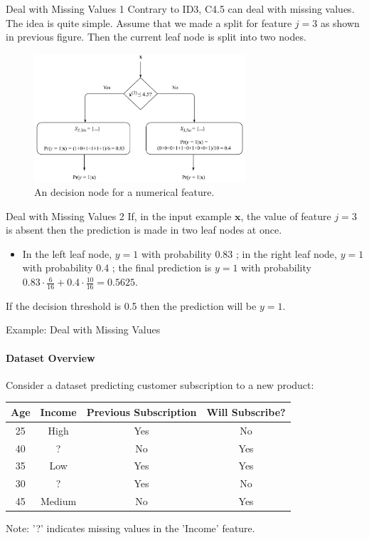 \documentclass[9pt,dvipsnames]{beamer}
\begin{document}
	\begin{frame}{Deal with Missing Values 1}
		Contrary to ID3, C4.5 can deal with missing values. The idea is quite simple. Assume that we made a split for feature $j=3$ as shown in previous figure. Then the current leaf node is split into two nodes.
		\begin{figure}
			\centering
			\includegraphics[width=0.7\textwidth]{imgs/algorithm_8.jpg}
			\caption{An decision node for a numerical feature.}
		\end{figure}
	\end{frame}
	\begin{frame}{Deal with Missing Values 2}
		If, in the input example $\mathbf{x}$, the value of feature $j=3$ is absent then the prediction is made in two leaf nodes at once. 
		\begin{itemize}
			\item In the left leaf node, $y=1$ with probability 0.83 ; in the right leaf node, $y=1$ with probability 0.4 ; the final prediction is $y=1$ with probability $0.83 \cdot \frac{6}{16}+0.4 \cdot \frac{10}{16}=0.5625$.
		\end{itemize}
		 If the decision threshold is 0.5 then the prediction will be $y=1$.
	\end{frame}
	
	\begin{frame}{Example: Deal with Missing Values}
		\framesubtitle{Dataset Overview}
		
		Consider a dataset predicting customer subscription to a new product:
		
		\begin{table}[h]
			\centering
			\begin{tabular}{cccc}
				\toprule
				Age & Income & Previous Subscription & Will Subscribe? \\
				\midrule
				25  & High   & Yes                   & No              \\
				40  & ?      & No                    & Yes             \\
				35  & Low    & Yes                   & Yes             \\
				30  & ?      & Yes                   & No              \\
				45  & Medium & No                    & Yes             \\
				\bottomrule
			\end{tabular}
		\end{table}
		\small{Note: '?' indicates missing values in the 'Income' feature.}
	\end{frame}
	
\end{document}
